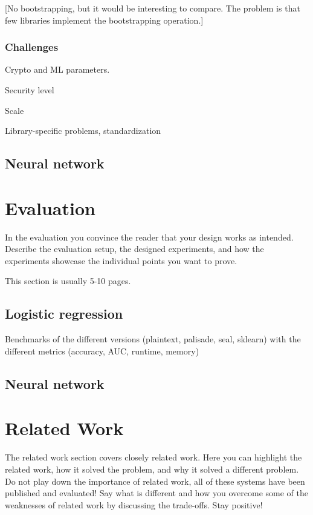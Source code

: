 \documentclass[a4paper,11pt,oneside]{report}
\begin{document}
[No bootstrapping, but it would be interesting to compare. The problem is that few libraries implement the bootstrapping operation.]

\subsection{Challenges}
Crypto and ML parameters.

Security level

Scale

Library-specific problems, standardization

\section{Neural network}



\chapter{Evaluation}\label{chap:evaluation}

In the evaluation you convince the reader that your design works as intended.
Describe the evaluation setup, the designed experiments, and how the
experiments showcase the individual points you want to prove.

This section is usually 5-10 pages.

\section{Logistic regression}

Benchmarks of the different versions (plaintext, palisade, seal, sklearn) with the different metrics (accuracy, AUC, runtime, memory)

\section{Neural network}



\chapter{Related Work}

The related work section covers closely related work. Here you can highlight
the related work, how it solved the problem, and why it solved a different
problem. Do not play down the importance of related work, all of these
systems have been published and evaluated! Say what is different and how
you overcome some of the weaknesses of related work by discussing the 
trade-offs. Stay positive!
\end{document}
